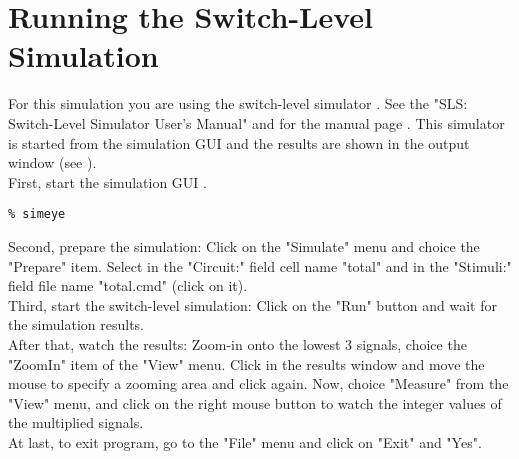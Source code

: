 \section{Running the Switch-Level Simulation}
For this simulation you are using the switch-level simulator .
See the "SLS: Switch-Level Simulator User's Manual" and for the manual page .
This simulator is started from the simulation GUI  and
the results are shown in the output window (see ).
\\[1 ex]
First, start the simulation GUI .
\small
\begin{Verbatim}
% simeye
\end{Verbatim}
\normalsize
Second, prepare the simulation:
Click on the "Simulate" menu and choice the "Prepare" item.
Select in the "Circuit:" field cell name "total" and
in the "Stimuli:" field file name "total.cmd" (click on it).
\\[1 ex]
Third, start the switch-level simulation:
Click on the "Run" button and wait for the simulation results.
\\[1 ex]
After that, watch the results:
Zoom-in onto the lowest 3 signals, choice the "ZoomIn" item of the "View" menu.
Click in the results window and move the mouse to specify a zooming area and click again.
Now, choice "Measure" from the "View" menu, and click on the right
mouse button to watch the integer values of the multiplied signals.
\\[1 ex]
At last, to exit  program,
go to the "File" menu and click on "Exit" and "Yes".
